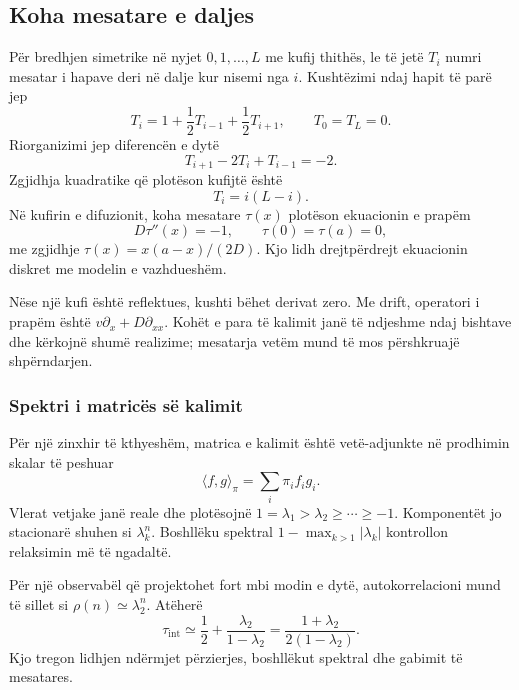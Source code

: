 \documentclass[11pt,oneside,openany]{book}
\begin{document}


\subsection{Koha mesatare e daljes}
Për bredhjen simetrike në nyjet $0,1,\ldots,L$ me kufij thithës, le të jetë $T_i$ numri mesatar i hapave deri në dalje kur nisemi nga $i$. Kushtëzimi ndaj hapit të parë jep
\begin{equation}
 T_i=1+\frac12T_{i-1}+\frac12T_{i+1},
 \qquad T_0=T_L=0.
\end{equation}
Riorganizimi jep diferencën e dytë
\begin{equation}
 T_{i+1}-2T_i+T_{i-1}=-2.
\end{equation}
Zgjidhja kuadratike që plotëson kufijtë është
\begin{equation}
 T_i=i(L-i).
\end{equation}
Në kufirin e difuzionit, koha mesatare $\tau(x)$ plotëson ekuacionin e prapëm
\begin{equation}
 D\tau''(x)=-1,\qquad \tau(0)=\tau(a)=0,
\end{equation}
me zgjidhje $\tau(x)=x(a-x)/(2D)$. Kjo lidh drejtpërdrejt ekuacionin diskret me modelin e vazhdueshëm.

Nëse një kufi është reflektues, kushti bëhet derivat zero. Me drift, operatori i prapëm është $v\partial_x+D\partial_{xx}$. Kohët e para të kalimit janë të ndjeshme ndaj bishtave dhe kërkojnë shumë realizime; mesatarja vetëm mund të mos përshkruajë shpërndarjen.

\subsubsection{Spektri i matricës së kalimit}
Për një zinxhir të kthyeshëm, matrica e kalimit është vetë-adjunkte në prodhimin skalar të peshuar
\begin{equation}
 \langle f,g\rangle_\pi=\sum_i\pi_if_ig_i.
\end{equation}
Vlerat vetjake janë reale dhe plotësojnë $1=\lambda_1>\lambda_2\ge\cdots\ge-1$. Komponentët jo stacionarë shuhen si $\lambda_k^n$. Boshllëku spektral $1-\max_{k>1}|\lambda_k|$ kontrollon relaksimin më të ngadaltë.

Për një observabël që projektohet fort mbi modin e dytë, autokorrelacioni mund të sillet si $\rho(n)\simeq\lambda_2^n$. Atëherë
\begin{equation}
 \tau_{\mathrm{int}}\simeq\frac12+\frac{\lambda_2}{1-\lambda_2}
 =\frac{1+\lambda_2}{2(1-\lambda_2)}.
\end{equation}
Kjo tregon lidhjen ndërmjet përzierjes, boshllëkut spektral dhe gabimit të mesatares.
\end{document}
